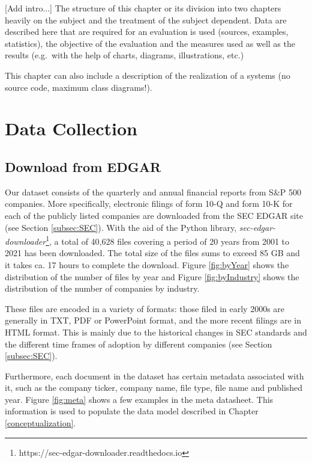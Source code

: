 
[Add intro...]
The structure of this chapter or its division into two chapters
heavily on the subject and the treatment of the subject
dependent. Data are described here that are required for an evaluation
is used (sources, examples, statistics), the objective of the evaluation
and the measures used as well as the results (e.g.~with the help of
charts, diagrams, illustrations, etc.)

This chapter can also include a description of the realization of a
systems (no source code, maximum class diagrams!).

\section {Data Collection} 

\subsection {Download from EDGAR}

Our dataset consists of the quarterly and annual financial reports from S\&P 500 companies. More specifically, electronic filings of form 10-Q and form 10-K for each of the publicly listed companies are downloaded from the SEC EDGAR site (see Section \ref{subsec:SEC}). With the aid of the Python library, \emph{sec-edgar-downloader}\footnote{ https://sec-edgar-downloader.readthedocs.io }, a total of 40,628 files covering a period of 20 years from 2001 to 2021 has been downloaded. The total size of the files sums to exceed 85 GB and it takes ca. 17 hours to complete the download. Figure \ref{fig:byYear}  shows the distribution of the number of files by year and Figure \ref{fig:byIndustry} shows the distribution of the number of companies by industry. 

These files are encoded in a variety of formats: those filed in early 2000s are generally in TXT, PDF or PowerPoint format, and the more recent filings are in HTML format. This is mainly due to the historical changes in SEC standards and the different time frames of adoption by different companies  (see Section \ref{subsec:SEC}).
 
Furthermore, each document in the dataset has certain metadata associated with it, such as the company ticker, company name, file type, file name and published year. Figure \ref{fig:meta} shows a few examples in the meta datasheet. This information is used to populate the data model described in Chapter \ref{conceptualization}. 

